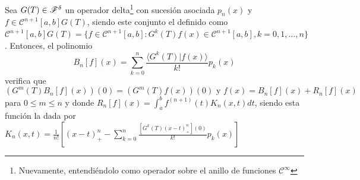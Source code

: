 \begin{teorema}
    Sea $G(T) \in \mathscr{F}^\delta$ un operador delta\footnote{Nuevamente, entendiéndolo como operador sobre el anillo de funciones $\mathcal{C}^\infty$} con sucesión asociada $p_n(x)$ y $f \in \mathcal{C}^{n+1}[a,b]G(T)$, siendo este conjunto el definido como $\mathcal{C}^{n+1}[a,b]G(T) = \{ f \in \mathcal{C}^{n+1}[a,b] \colon G^k(T)f(x) \in \mathcal{C}^{n+1}[a,b], k = 0, 1, \dots, n\}$. Entonces, el polinomio
    \begin{equation*}
        B_n[f](x) = \sum_{k=0}^n \frac{\langle G^k(T) | f(x) \rangle}{k!} p_k(x)
    \end{equation*}
    verifica que
    \begin{equation*}
        (G^m(T)B_n[f](x))(0) = (G^m(T)f(x))(0) \text{ y } f(x) = B_n[f](x) + R_n[f](x)
    \end{equation*}
    para $0 \leq m \leq n$ y donde $R_n[f](x) = \int_{a}^{b} f^{(n+1)}(t)K_n(x,t) dt $, siendo esta función la dada por $K_n(x,t) = \frac{1}{n!}[(x-t)_{+}^n - \sum_{k=0}^n \frac{[G^k(T)(x-t)_{+}^n](0)}{k!} p_k(x)]$
\end{teorema}

